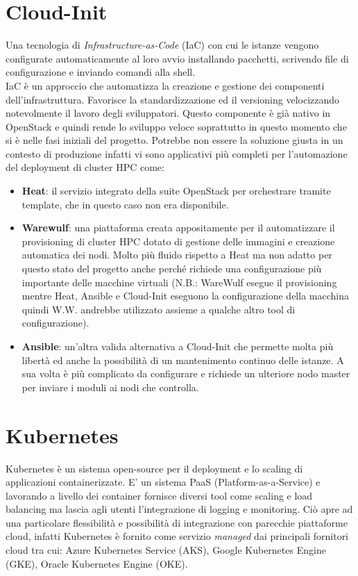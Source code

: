 \section{Cloud-Init}
Una tecnologia di \textit{Infrastructure-as-Code} (IaC) con cui le istanze vengono configurate automaticamente al loro avvio installando pacchetti, scrivendo file di configurazione e inviando comandi alla shell. \\
IaC è un approccio che automatizza la creazione e gestione dei componenti dell'infrastruttura. Favorisce la standardizzazione ed il versioning velocizzando notevolmente il lavoro degli sviluppatori.
Questo componente è già nativo in OpenStack e quindi rende lo sviluppo veloce soprattutto in questo momento che si è nelle fasi iniziali del progetto. Potrebbe non essere la soluzione giusta in un contesto di produzione infatti vi sono applicativi più completi per l'automazione del deployment di cluster HPC come:
\begin{itemize}
    \item \textbf{Heat}: il servizio integrato della suite OpenStack per orchestrare tramite template, che in questo caso non era disponibile.
    \item \textbf{Warewulf}: una piattaforma creata appositamente per il automatizzare il provisioning di cluster HPC dotato di gestione delle immagini e creazione automatica dei nodi. Molto più fluido rispetto a Heat ma non adatto per questo stato del progetto anche perché richiede una configurazione più importante delle macchine virtuali (N.B.: WareWulf esegue il provisioning mentre Heat, Ansible e Cloud-Init eseguono la configurazione della macchina quindi W.W. andrebbe utilizzato assieme a qualche altro tool di configurazione).
    \item \textbf{Ansible}: un'altra valida alternativa a Cloud-Init che permette molta più libertà ed anche la possibilità di un mantenimento continuo delle istanze. A sua volta è più complicato da configurare e richiede un ulteriore nodo master per inviare i moduli ai nodi che controlla.
\end{itemize}
%
\section{Kubernetes}
\label{sec:kube}
Kubernetes è un sistema open-source per il deployment e lo scaling di applicazioni containerizzate. E' un sistema PaaS (Platform-as-a-Service) e lavorando a livello dei container fornisce diversi tool come scaling e load balancing ma lascia agli utenti l'integrazione di logging e monitoring. Ciò apre ad una particolare flessibilità e possibilità di integrazione con parecchie piattaforme cloud, infatti Kubernetes è fornito come servizio \textit{managed} dai principali fornitori cloud tra cui: Azure Kubernetes Service (AKS), Google Kubernetes Engine (GKE), Oracle Kubernetes Engine (OKE).
